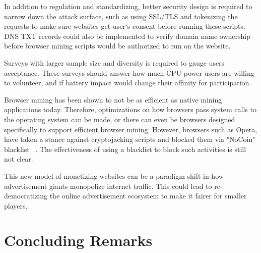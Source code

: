 In addition to regulation and standardizing, better security design is required to narrow down the attack surface, such as using SSL/TLS and tokenizing the requests to make sure websites get user`s consent before running these scripts. DNS TXT records could also be implemented to verify domain name ownership before browser mining scripts would be authorized to run on the website.

Surveys with larger sample size and diversity is required to gauge users acceptance. These surveys should answer how much CPU power users are willing to volunteer, and if battery impact would change their affinity for participation.

Browser mining has been shown to not be as efficient as native mining applications today. Therefore, optimizations on how browsers pass system calls to the operating system can be made, or there can even be browsers designed specifically to support efficient browser mining. However, browsers such as Opera, have taken a stance against cryptojacking scripts and blocked them via "NoCoin" blacklist ~\cite{operanocoin}. The effectiveness of using a blacklist to block such activities is still not clear. %

This new model of monetizing websites can be a paradigm shift in how advertisement giants monopolize internet traffic. This could lead to re-democratizing the online advertisement ecosystem to make it fairer for smaller players.


\section{Concluding Remarks}



















